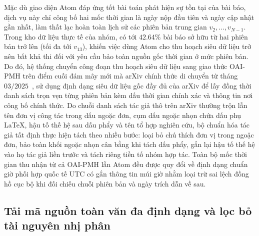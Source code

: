Mặc dù giao diện Atom đáp ứng tốt bài toán phát hiện sự tồn tại của bài báo, dịch vụ này chỉ công bố hai mốc thời gian là ngày nộp đầu tiên và ngày cập nhật gần nhất, làm thất lạc hoàn toàn lịch sử các phiên bản trung gian $v_2, \dots, v_{N-1}$. Trong kho dữ liệu thực tế của nhóm, có tới $42.64\%$ bài báo sở hữu từ hai phiên bản trở lên (tối đa tới $v_{13}$), khiến việc dùng Atom cho thu hoạch siêu dữ liệu trở nên bất khả thi đối với yêu cầu bảo toàn nguồn gốc thời gian ở mức phiên bản. Do đó, hệ thống chuyển công đoạn thu hoạch siêu dữ liệu sang giao thức OAI-PMH trên điểm cuối đám mây mới mà arXiv chính thức di chuyển từ tháng $03/2025$~\cite{arxiv_oai_2025}, sử dụng định dạng siêu dữ liệu gốc đầy đủ của arXiv để lấy đồng thời danh sách trọn vẹn từng phiên bản kèm dấu thời gian chính xác và thông tin nơi công bố chính thức. Do chuỗi danh sách tác giả thô trên arXiv thường trộn lẫn tên đơn vị công tác trong dấu ngoặc đơn, cụm dấu ngoặc nhọn chứa dấu phụ LaTeX, hậu tố thế hệ sau dấu phẩy và tên tổ hợp nghiên cứu, bộ chuẩn hóa tác giả tất định thực hiện tách theo nhiều bước: loại bỏ chú thích đơn vị trong ngoặc đơn, bảo toàn khối ngoặc nhọn cân bằng khi tách dấu phẩy, gắn lại hậu tố thế hệ vào họ tác giả liền trước và tách riêng tiền tố nhóm hợp tác. Toàn bộ mốc thời gian thu nhận từ cả OAI-PMH lẫn Atom đều được quy đổi về định dạng chuẩn giờ phối hợp quốc tế UTC có gắn thông tin múi giờ nhằm loại trừ sai lệch đồng hồ cục bộ khi đối chiếu chuỗi phiên bản và ngày trích dẫn về sau.

\subsection{Tải mã nguồn toàn văn đa định dạng và lọc bỏ tài nguyên nhị phân}


